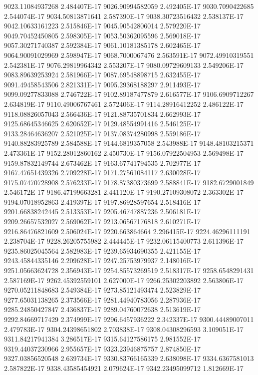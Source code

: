 9023.11084937268  2.484407E-17
9026.90994582059  2.492405E-17
9030.7090422685  2.544074E-17
9034.50813871641  2.587390E-17
9038.30723516432  2.538137E-17
9042.10633161223  2.515846E-17
9045.90542806014  2.579220E-17
9049.70452450805  2.598305E-17
9053.50362095596  2.569018E-17
9057.30271740387  2.592384E-17
9061.10181385178  2.602465E-17
9064.90091029969  2.598947E-17
9068.7000067476  2.563591E-17
9072.49910319551  2.542381E-17
9076.29819964342  2.553207E-17
9080.09729609133  2.549206E-17
9083.89639253924  2.581966E-17
9087.69548898715  2.632455E-17
9091.49458543506  2.821331E-17
9095.29368188297  2.911493E-17
9099.09277833088  2.746722E-17
9102.89187477879  2.616577E-17
9106.6909712267  2.634819E-17
9110.49006767461  2.572406E-17
9114.28916412252  2.486122E-17
9118.08826057043  2.566436E-17
9121.88735701834  2.662993E-17
9125.68645346625  2.620652E-17
9129.48554991416  2.546125E-17
9133.28464636207  2.521025E-17
9137.08374280998  2.559186E-17
9140.88283925789  2.584588E-17
9144.6819357058  2.543988E-17
9148.48103215371  2.473361E-17
9152.28012860162  2.450730E-17
9156.07922504953  2.569498E-17
9159.87832149744  2.673462E-17
9163.67741794535  2.702977E-17
9167.47651439326  2.709228E-17
9171.27561084117  2.630028E-17
9175.07470728908  2.576233E-17
9178.87380373699  2.588841E-17
9182.6729001849  2.546172E-17
9186.47199663281  2.441120E-17
9190.27109308072  2.363302E-17
9194.07018952863  2.419397E-17
9197.86928597654  2.518416E-17
9201.66838242445  2.513353E-17
9205.46747887236  2.506181E-17
9209.26657532027  2.569062E-17
9213.06567176818  2.610271E-17
9216.86476821609  2.506024E-17
9220.663864664  2.296415E-17
9224.46296111191  2.238704E-17
9228.26205755982  2.444445E-17
9232.06115400773  2.611396E-17
9235.86025045564  2.582983E-17
9239.65934690355  2.421155E-17
9243.45844335146  2.209628E-17
9247.25753979937  2.148016E-17
9251.05663624728  2.356943E-17
9254.85573269519  2.518317E-17
9258.6548291431  2.587169E-17
9262.45392559101  2.627000E-17
9266.25302203892  2.563806E-17
9270.05211848683  2.549384E-17
9273.85121493474  2.523829E-17
9277.65031138265  2.373566E-17
9281.44940783056  2.287936E-17
9285.24850427847  2.436837E-17
9289.04760072638  2.513619E-17
9292.84669717429  2.374999E-17
9296.6457936222  2.342337E-17
9300.44489007011  2.479783E-17
9304.24398651802  2.703838E-17
9308.04308296593  3.109051E-17
9311.84217941384  3.286517E-17
9315.64127586175  2.981552E-17
9319.44037230966  2.955657E-17
9323.23946875757  2.874850E-17
9327.03856520548  2.639734E-17
9330.83766165339  2.638098E-17
9334.6367581013  2.587822E-17
9338.43585454921  2.079624E-17
9342.23495099712  1.812669E-17
